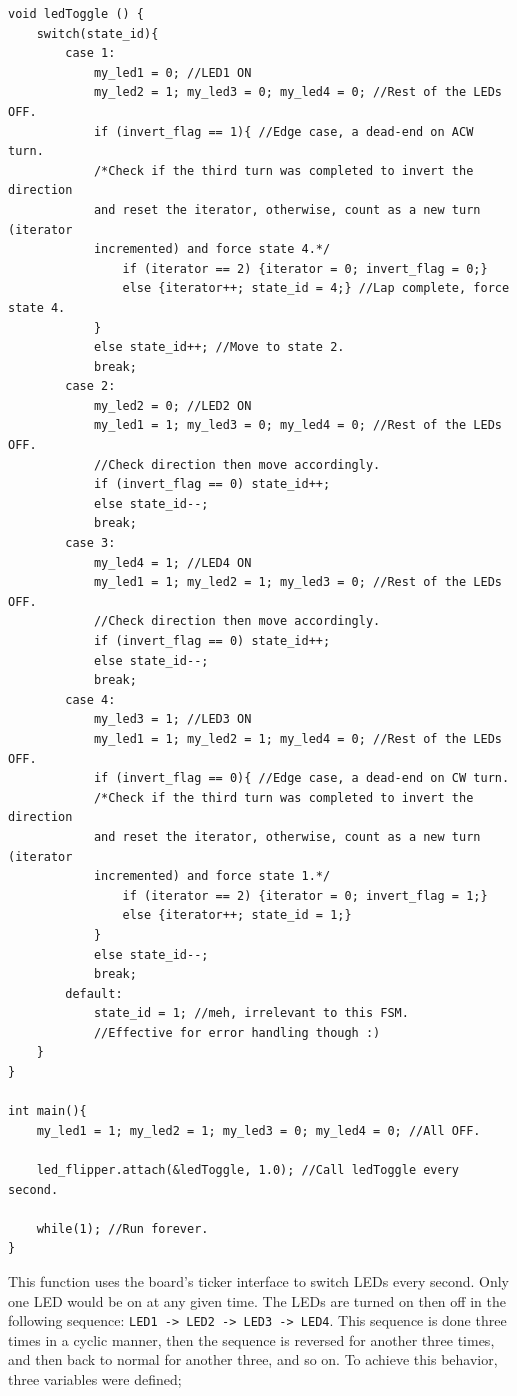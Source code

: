 \documentclass{article}
\begin{document}
\begin{verbatim}
void ledToggle () {
    switch(state_id){
        case 1:
            my_led1 = 0; //LED1 ON
            my_led2 = 1; my_led3 = 0; my_led4 = 0; //Rest of the LEDs OFF.
            if (invert_flag == 1){ //Edge case, a dead-end on ACW turn.
            /*Check if the third turn was completed to invert the direction
            and reset the iterator, otherwise, count as a new turn (iterator
            incremented) and force state 4.*/
                if (iterator == 2) {iterator = 0; invert_flag = 0;}
                else {iterator++; state_id = 4;} //Lap complete, force state 4.
            }
            else state_id++; //Move to state 2.
            break;
        case 2:
            my_led2 = 0; //LED2 ON
            my_led1 = 1; my_led3 = 0; my_led4 = 0; //Rest of the LEDs OFF.
            //Check direction then move accordingly.
            if (invert_flag == 0) state_id++; 
            else state_id--;
            break;
        case 3:
            my_led4 = 1; //LED4 ON
            my_led1 = 1; my_led2 = 1; my_led3 = 0; //Rest of the LEDs OFF.
            //Check direction then move accordingly.
            if (invert_flag == 0) state_id++;
            else state_id--;
            break;
        case 4:
            my_led3 = 1; //LED3 ON
            my_led1 = 1; my_led2 = 1; my_led4 = 0; //Rest of the LEDs OFF.
            if (invert_flag == 0){ //Edge case, a dead-end on CW turn.
            /*Check if the third turn was completed to invert the direction
            and reset the iterator, otherwise, count as a new turn (iterator
            incremented) and force state 1.*/
                if (iterator == 2) {iterator = 0; invert_flag = 1;}
                else {iterator++; state_id = 1;}
            }
            else state_id--;
            break;
        default:
            state_id = 1; //meh, irrelevant to this FSM. 
            //Effective for error handling though :)
    }
}

int main(){
    my_led1 = 1; my_led2 = 1; my_led3 = 0; my_led4 = 0; //All OFF.
    
    led_flipper.attach(&ledToggle, 1.0); //Call ledToggle every second.
    
    while(1); //Run forever.
}
\end{verbatim}
\pagebreak

This function uses the board's ticker interface to switch LEDs every second. Only one LED would be on at any given time. The LEDs are turned on then off in the following sequence: \texttt{LED1 -> LED2 -> LED3 -> LED4}.
This sequence is done three times in a cyclic manner, then the sequence is reversed for another three times, and then back to normal for another three, and so on. To achieve this behavior, three variables were defined; 
\end{document}
